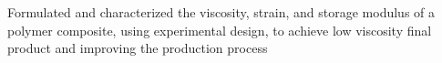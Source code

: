 \begin{cventries}
{\begin{cvitemsfree}
                \item{Formulated and characterized the viscosity, strain, and storage modulus of a polymer composite, using experimental design, to achieve low viscosity final product and improving the production process}
            \end{cvitemsfree}
        }
\end{cventries}